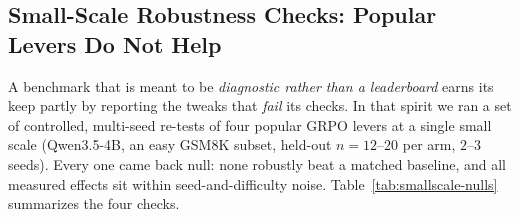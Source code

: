 %

\subsection{Small-Scale Robustness Checks: Popular Levers Do Not Help}
\label{sec:smallscale-nulls}

A benchmark that is meant to be \emph{diagnostic rather than a
leaderboard} earns its keep partly by reporting the tweaks that
\emph{fail} its checks. In that spirit we ran a set of controlled,
multi-seed re-tests of four popular GRPO levers at a single small scale
(Qwen3.5-4B, an easy GSM8K subset, held-out $n{=}12$--$20$ per arm,
$2$--$3$ seeds). Every one came back null: none robustly beat a matched
baseline, and all measured effects sit within seed-and-difficulty noise.
Table~\ref{tab:smallscale-nulls} summarizes the four checks.

